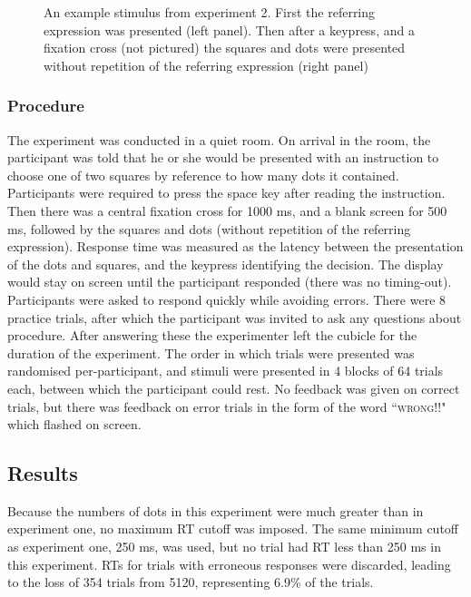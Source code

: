 \documentclass[man,floatmark]{apa}
\begin{document}
\begin{figure}[tbp]
\caption{An example stimulus from experiment 2. First the referring expression was presented (left panel). Then after a keypress, and a fixation cross (not pictured) the squares and dots were presented without repetition of the referring expression (right panel)}
\label{stimuluse2}
\end{figure}

\subsubsection{Procedure}

The experiment was conducted in a quiet room. On arrival in the room, the participant was told that he or she would be presented with an instruction to choose one of two squares by reference to how many dots it contained. Participants were required to press the space key after reading the instruction. Then there was a central fixation cross for 1000 ms, and a blank screen for 500 ms, followed by the squares and dots (without repetition of the referring expression). Response time was measured as the latency between the presentation of the dots and squares, and the keypress identifying the decision. The display would stay on screen until the participant responded (there was no timing-out). Participants were asked to respond quickly while avoiding errors. There were 8 practice trials, after which the participant was invited to ask any questions about procedure. After answering these the experimenter left the cubicle for the duration of the experiment. The order in which trials were presented was randomised per-participant, and stimuli were presented in 4 blocks of 64 trials each, between which the participant could rest. No feedback was given on correct trials, but there was feedback on error trials in the form of the word ``\textsc{wrong!!}" which flashed on screen.

\subsection{Results}

Because the numbers of dots in this experiment were much greater than in experiment one, no maximum RT cutoff was imposed. The same minimum cutoff as experiment one, 250 ms, was used, but no trial had RT less than 250 ms in this experiment. RTs for trials with erroneous responses were discarded, leading to the loss of 354 trials from 5120, representing 6.9\% of the trials.
\end{document}
